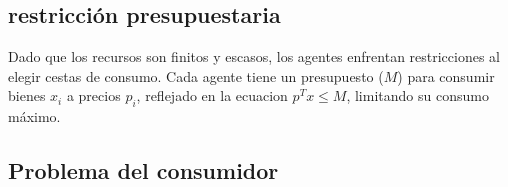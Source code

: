 \documentclass[11pt]{article}
\begin{document}
\subsection{restricción presupuestaria}

\begin{flushleft}
    Dado que los recursos son finitos y escasos, los agentes enfrentan restricciones al elegir cestas de consumo. Cada agente tiene un presupuesto ($M$) para consumir bienes $x_i$ a precios  $p_i$, reflejado en la ecuacion $p^Tx\leq M$, limitando su consumo máximo.
\end{flushleft}


\subsection{Problema del consumidor}
\end{document}
